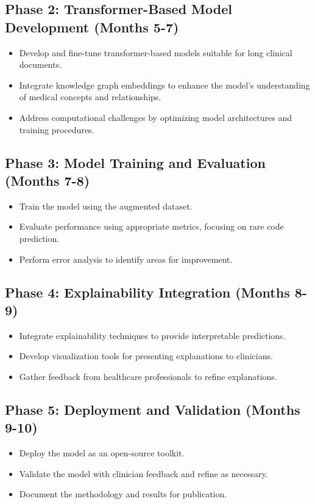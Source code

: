 \documentclass[12pt,a4paper]{report}
\begin{document}
\subsection{Phase 2: Transformer-Based Model Development (Months 5-7)}
\begin{itemize}
    \item Develop and fine-tune transformer-based models suitable for long clinical documents.
    \item Integrate knowledge graph embeddings to enhance the model's understanding of medical concepts and relationships.
    \item Address computational challenges by optimizing model architectures and training procedures.
\end{itemize}

\subsection{Phase 3: Model Training and Evaluation (Months 7-8)}
\begin{itemize}
    \item Train the model using the augmented dataset.
    \item Evaluate performance using appropriate metrics, focusing on rare code prediction.
    \item Perform error analysis to identify areas for improvement.
\end{itemize}

\subsection{Phase 4: Explainability Integration (Months 8-9)}
\begin{itemize}
    \item Integrate explainability techniques to provide interpretable predictions.
    \item Develop visualization tools for presenting explanations to clinicians.
    \item Gather feedback from healthcare professionals to refine explanations.
\end{itemize}

\subsection{Phase 5: Deployment and Validation (Months 9-10)}
\begin{itemize}
    \item Deploy the model as an open-source toolkit.
    \item Validate the model with clinician feedback and refine as necessary.
    \item Document the methodology and results for publication.
\end{itemize}
\end{document}
